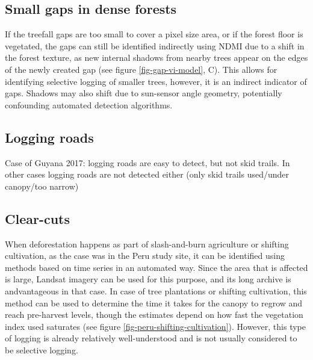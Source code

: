 \documentclass[a4paper,12pt]{scrbook}
\begin{document}
\subsection{Small gaps in dense forests}


If the treefall gaps are too small to cover a pixel size area, or if the forest floor is vegetated, the gaps can still be identified indirectly using \ac{NDMI} due to a shift in the forest texture, as new internal shadows from nearby trees appear on the edges of the newly created gap (see figure \ref{fig-gap-vi-model}, C). This allows for identifying selective logging of smaller trees, however, it is an indirect indicator of gaps. Shadows may also shift due to sun-sensor angle geometry, potentially confounding automated detection algorithms.

\subsection{Logging roads}

Case of Guyana 2017: logging roads are easy to detect, but not skid trails. In other cases logging roads are not detected either (only skid trails used/under canopy/too narrow)

\subsection{Clear-cuts}


When deforestation happens as part of slash-and-burn agriculture or shifting cultivation, as the case was in the Peru study site, it can be identified using methods based on time series in an automated way. Since the area that is affected is large, Landsat imagery can be used for this purpose, and its long archive is andvantageous in that case. In case of tree plantations or shifting cultivation, this method can be used to determine the time it takes for the canopy to regrow and reach pre-harvest levels, though the estimates depend on how fast the vegetation index used saturates (see figure \ref{fig-peru-shifting-cultivation}). However, this type of logging is already relatively well-understood and is not usually considered to be selective logging.
\end{document}
